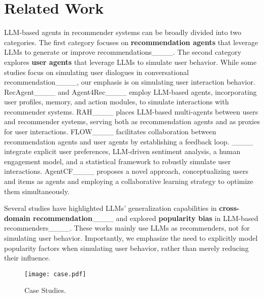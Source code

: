 \section{Related Work}
LLM-based agents in recommender systems can be broadly divided into two categories.
The first category focuses on \textbf{recommendation agents} that leverage LLMs to generate or improve recommendations____.
%
The second category explores \textbf{user agents} that leverage LLMs to simulate user behavior.
While some studies focus on simulating user dialogues in conversational recommendation____, our emphasis is on simulating user interaction behavior.
RecAgent____ and Agent4Rec____ employ LLM-based agents, incorporating user profiles, memory, and action modules, to simulate interactions with recommender systems.
RAH____ places LLM-based multi-agents between users and recommender systems, serving both as recommendation agents and as proxies for user interactions.
FLOW____ facilitates collaboration between recommendation agents and user agents by establishing a feedback loop.
____ integrate explicit user preferences, LLM-driven sentiment analysis, a human engagement model, and a statistical framework to robustly simulate user interactions.
AgentCF____ proposes a novel approach, conceptualizing users and items as agents and employing a collaborative learning strategy to optimize them simultaneously.

Several studies have highlighted LLMs' generalization capabilities in \textbf{cross-domain recommendation}____ and explored \textbf{popularity bias} in LLM-based recommenders____.
These works mainly use LLMs as recommenders, not for simulating user behavior.
Importantly, we emphasize the need to explicitly model popularity factors when simulating user behavior, rather than merely reducing their influence.

\begin{figure}[t]
  \centering
  \texttt{[image: case.pdf]}
  \caption{Case Studies.}
  \label{fig:93mi}
\end{figure}